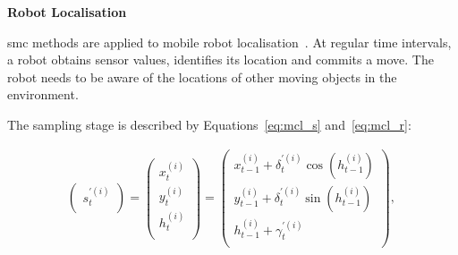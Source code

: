 



\pagebreak
\textbf{Robot Localisation}

\gls{smc} methods are applied to mobile robot localisation~\cite{chau14trets,montemerlo02}.
At regular time intervals, a robot obtains sensor values, identifies its location and commits a move.
The robot needs to be aware of the locations of other moving objects in the environment.

The sampling stage is described by Equations~\ref{eq:mcl_s} and~\ref{eq:mcl_r}:

\begin{equation}
\begin{aligned}
  \begin{pmatrix}
    s^{\prime(i)}_t    \\ 
  \end{pmatrix}
  =
  \begin{pmatrix}
    x^{(i)}_t    \\ 
    y^{(i)}_t    \\ 
    h^{(i)}_t    \\ 
  \end{pmatrix}
  =
  \begin{pmatrix}
  	x^{(i)}_{t-1} + \delta^{\prime(i)}_{t} \cos(h^{(i)}_{t-1}) \\
		y^{(i)}_{t-1} + \delta^{\prime(i)}_{t} \sin(h^{(i)}_{t-1}) \\
		h^{(i)}_{t-1} + \gamma^{\prime(i)}_{t} \\
  \end{pmatrix}
	\mbox{, }
\end{aligned}
\label{eq:mcl_s}
\end{equation}


